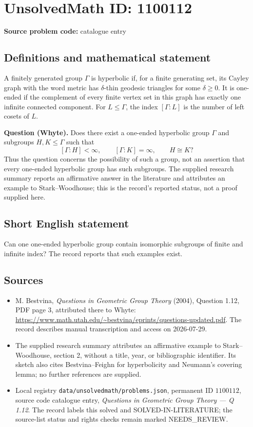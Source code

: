 \documentclass[11pt]{article}
\begin{document}
\section*{UnsolvedMath ID: 1100112}
\textbf{Source problem code:} catalogue entry
\subsection{Definitions and mathematical statement}
A finitely generated group $\Gamma$ is hyperbolic if, for a finite generating set, its Cayley graph with the word metric has $\delta$-thin geodesic triangles for some $\delta\geq0$. It is one-ended if the complement of every finite vertex set in this graph has exactly one infinite connected component. For $L\leq\Gamma$, the index $[\Gamma:L]$ is the number of left cosets of $L$.

\textbf{Question (Whyte).} Does there exist a one-ended hyperbolic group $\Gamma$ and subgroups $H,K\leq\Gamma$ such that
\[
[\Gamma:H]<\infty,\qquad [\Gamma:K]=\infty,\qquad H\cong K?
\]
Thus the question concerns the possibility of such a group, not an assertion that every one-ended hyperbolic group has such subgroups. The supplied research summary reports an affirmative answer in the literature and attributes an example to Stark--Woodhouse; this is the record's reported status, not a proof supplied here.
\subsection{Short English statement}
Can one one-ended hyperbolic group contain isomorphic subgroups of finite and infinite index? The record reports that such examples exist.
\subsection{Sources}
\begin{itemize}
\item M. Bestvina, \emph{Questions in Geometric Group Theory} (2004), Question 1.12, PDF page 3, attributed there to Whyte: \url{https://www.math.utah.edu/~bestvina/eprints/questions-updated.pdf}. The record describes manual transcription and access on 2026-07-29.
\item The supplied research summary attributes an affirmative example to Stark--Woodhouse, section 2, without a title, year, or bibliographic identifier. Its sketch also cites Bestvina--Feighn for hyperbolicity and Neumann's covering lemma; no further references are supplied.
\item Local registry \texttt{data/unsolvedmath/problems.json}, permanent ID $1100112$, source code catalogue entry, \emph{Questions in Geometric Group Theory --- Q 1.12}. The record labels this solved and SOLVED-IN-LITERATURE; the source-list status and rights checks remain marked NEEDS\_REVIEW.
\end{itemize}
\end{document}
